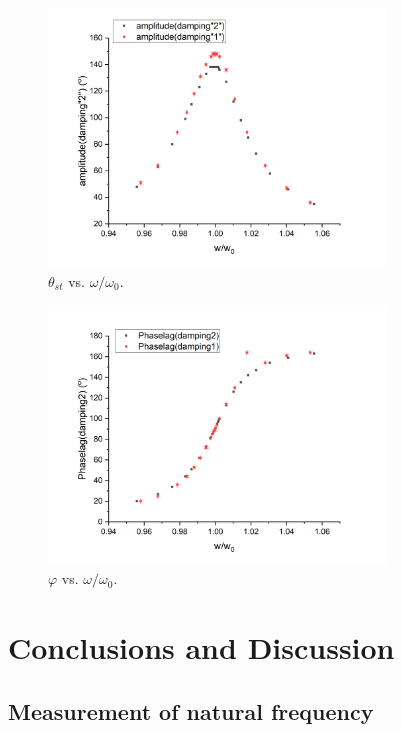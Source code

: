 \documentclass[a4paper]{article}
\begin{document}
\begin{figure}[htbp]
\centering
\includegraphics[width=0.8\textwidth]{amplitude.png}
\caption{$\theta_{st}$ vs. $\omega/\omega_0$.}\label{Fig:amplitude}
\end{figure}

\begin{figure}[htbp]
\centering
\includegraphics[width=0.8\textwidth]{phaselag.png}
\caption{$\varphi$ vs. $\omega/\omega_0$.}\label{Fig:phaselag}
\end{figure}

\newpage

\section{Conclusions and Discussion}

\subsection{Measurement of natural frequency}
\end{document}
